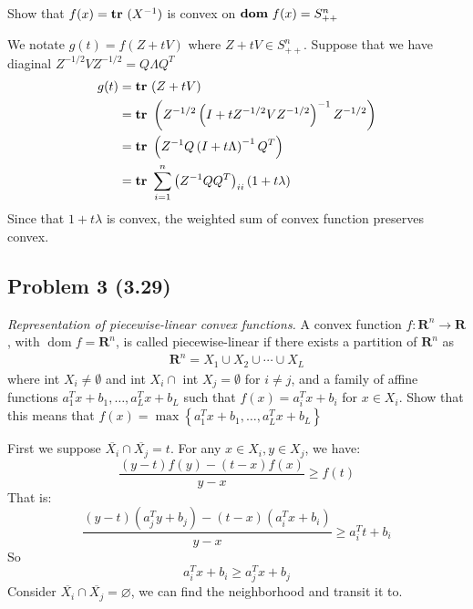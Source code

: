 \documentclass[en,hazy,blue,12pt,device = pad]{elegantnote}
\begin{document}
\begin{center}
    Show that \(f(x) = {\textbf{tr}\ }(X^{-1})\) is convex on \({\textbf{dom}\ } f(x) = S_{++}^n\)
\end{center}

\begin{tcolorbox}
    \sol

    We notate \(g(t) = f(Z+tV)\) where \(Z+tV \in S_{++}^n\). Suppose that we have diaginal \(Z^{-1/2}V Z^{-1/2} = Q\Lambda Q^T\)
    \begin{align*}
        g(t) &= {\textbf{tr}\ } (Z + tV)\\
        &= {\textbf{tr}\ } \left( Z^{-1/2} \left( I + tZ^{-1/2}V Z^{-1/2} \right)^{-1} Z^{-1/2} \right) \\
        &= {\textbf{tr}\ } \left( Z^{-1}Q\left( I + t\Lambda  \right)^{-1} Q^T \right) \\
        &= {\textbf{tr}\ } \sum_{i=1}^{n} \left( Z^{-1}Q Q^T  \right)_{ii}(1+t \lambda )
    \end{align*}
    Since that \(1+t\lambda\) is convex, the weighted sum of convex function preserves convex.
\end{tcolorbox}

\subsection*{Problem 3 (3.29)}
\textit{Representation of piecewise-linear convex functions.} A convex function \(f: \mathbf{R}^n \rightarrow \mathbf{R}\), with \(\operatorname{dom} f=\mathbf{R}^n\), is called piecewise-linear if there exists a partition of \(\mathbf{R}^n\) as
\begin{align*}
\mathbf{R}^n=X_1 \cup X_2 \cup \cdots \cup X_L
\end{align*}
where int \(X_i \neq \emptyset\) and int \(X_i \cap\) int \(X_j=\emptyset\) for \(i \neq j\), and a family of affine functions \(a_1^T x+b_1, \ldots, a_L^T x+b_L\) such that \(f(x)=a_i^T x+b_i\) for \(x \in X_i\).
Show that this means that \(f(x)=\max \left\{a_1^T x+b_1, \ldots, a_L^T x+b_L\right\}\)

\begin{tcolorbox}
    \sol

    First we suppose \(\overline{X_i}\cap \overline{X_j } = t\). For any \(x \in X_i, y \in X_j \), we have:
    \[\frac{(y-t)f(y) - (t-x)f(x)}{y-x} \geq f(t)\]
    That is:
    \[\frac{(y-t)(a_j^T y +b_j ) - (t-x)(a_i^T x +b_i)}{y-x} \geq a_i ^T t + b_i\]
    So \[a_i ^T x + b_i \geq a_j^T x +b_j\]
    Consider \(\overline{X_i}\cap \overline{X_j } = \varnothing\), we can find the neighborhood and transit it to.
\end{tcolorbox}
\end{document}
